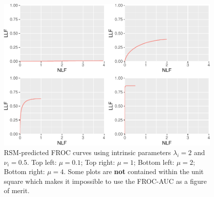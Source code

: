 \documentclass[
]{book}
\begin{document}
\begin{figure}
\centering
\includegraphics{08-rsm-predictions2_files/figure-latex/rsm-other-predictions-froc-plots-lambdai-nui-1.pdf}
\caption{\label{fig:rsm-other-predictions-froc-plots-lambdai-nui}RSM-predicted FROC curves using intrinsic parameters \(\lambda_i = 2\) and \(\nu_i = 0.5\). Top left: \(\mu = 0.1\); Top right: \(\mu = 1\); Bottom left: \(\mu = 2\); Bottom right: \(\mu = 4\). Some plots are \textbf{not} contained within the unit square which makes it impossible to use the FROC-AUC as a figure of merit.}
\end{figure}
\end{document}
